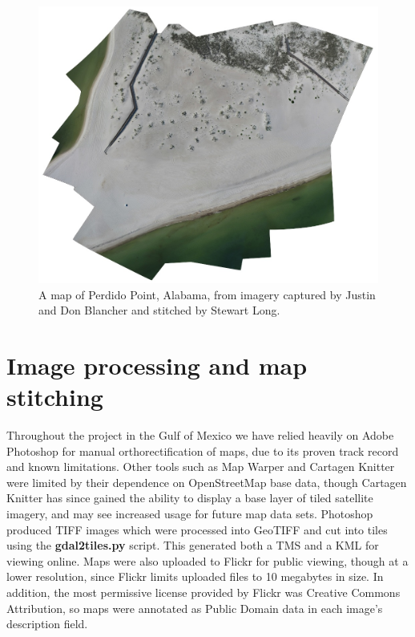 \documentclass[11pt,oneside,notitlepage]{report}
\begin{document}
{{\begin{figure}[p]
  \begin{center}
	\includegraphics[width=1\textwidth]{images/perdido-point.jpg}
	\caption{A map of Perdido Point, Alabama, from imagery captured by Justin and Don Blancher and stitched by Stewart Long.}
  \end{center}
\end{figure}

\section{Image processing and map stitching}

Throughout the project in the Gulf of Mexico we have relied heavily on Adobe Photoshop for manual orthorectification of maps, due to its proven track record and known limitations. Other tools such as Map Warper and Cartagen Knitter were limited by their dependence on OpenStreetMap base data, though Cartagen Knitter has since gained the ability to display a base layer of tiled satellite imagery, and may see increased usage for future map data sets. Photoshop produced \ac{TIFF} images which were processed into \ac{GeoTIFF} and cut into tiles using the \textbf{gdal2tiles.py} script. This generated both a \ac{TMS} and a \ac{KML} for viewing online. Maps were also uploaded to Flickr for public viewing, though at a lower resolution, since Flickr limits uploaded files to 10 megabytes in size. In addition, the most permissive license provided by Flickr was Creative Commons Attribution, so maps were annotated as Public Domain data in each image's description field. 

}}
\end{document}
